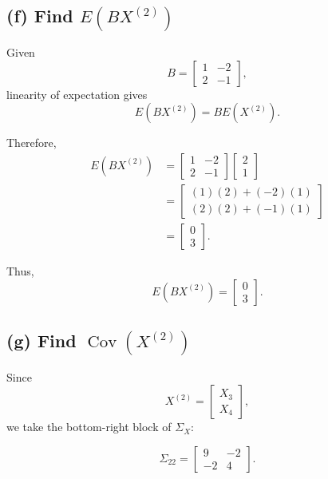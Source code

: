 \documentclass[12pt]{article}
\begin{document}
	\subsection*{(f) Find $E(BX^{(2)})$}
	
	Given
	\[
	B=
	\begin{bmatrix}
		1&-2\\
		2&-1
	\end{bmatrix},
	\]
	linearity of expectation gives
	\[
	\boxed{
		E(BX^{(2)})=BE(X^{(2)}).
	}
	\]
	
	Therefore,
	\[
	\begin{aligned}
		E(BX^{(2)})
		&=
		\begin{bmatrix}
			1&-2\\
			2&-1
		\end{bmatrix}
		\begin{bmatrix}
			2\\
			1
		\end{bmatrix}\\
		&=
		\begin{bmatrix}
			(1)(2)+(-2)(1)\\
			(2)(2)+(-1)(1)
		\end{bmatrix}\\
		&=
		\begin{bmatrix}
			0\\
			3
		\end{bmatrix}.
	\end{aligned}
	\]
	
	Thus,
	\[
	\boxed{
		E(BX^{(2)})
		=
		\begin{bmatrix}
			0\\
			3
		\end{bmatrix}
	}.
	\]
	
	\subsection*{(g) Find $\operatorname{Cov}(X^{(2)})$}
	
	Since
	\[
	X^{(2)}
	=
	\begin{bmatrix}
		X_3\\
		X_4
	\end{bmatrix},
	\]
	we take the bottom-right block of $\Sigma_X$:
	
	\[
	\Sigma_{22}
	=
	\begin{bmatrix}
		9&-2\\
		-2&4
	\end{bmatrix}.
	\]
	
\end{document}
